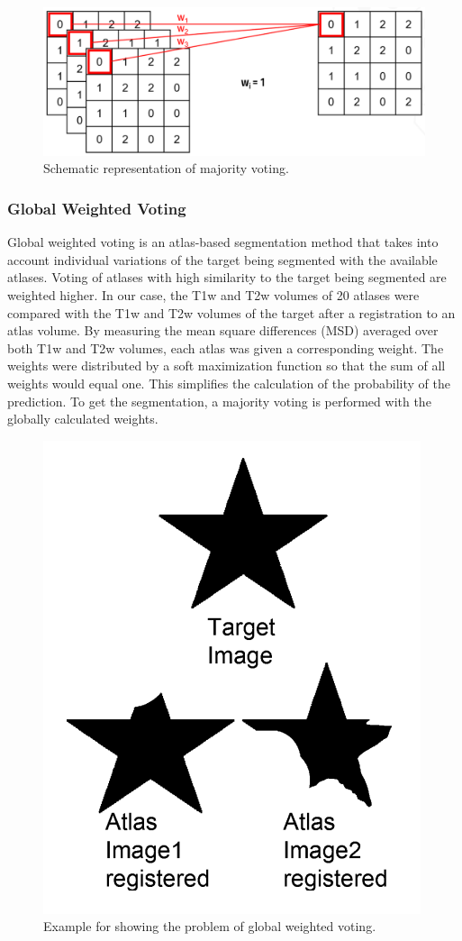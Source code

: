 \begin{figure}[h!]
	\centering
	\includegraphics[width=0.8\linewidth]{img/majorityVoting}
	\caption{Schematic representation of majority voting.}
	\label{fig:majorityVoting}
\end{figure}

\subsubsection*{Global Weighted Voting}
Global weighted voting is an atlas-based segmentation method that takes into account individual variations of the target being segmented with the available atlases. Voting of atlases with high similarity to the target being segmented are weighted higher. In our case, the T1w and T2w volumes of 20 atlases were compared with the T1w and T2w volumes of the target after a registration to an atlas volume. By measuring the mean square differences (MSD) averaged over both T1w and T2w volumes, each atlas was given a corresponding weight.  The weights were distributed by a soft maximization function so that the sum of all weights would equal one. This simplifies the calculation of the probability of the prediction. To get the segmentation, a majority voting is performed with the globally calculated weights.

\begin{figure}[h!]
	\centering
	\includegraphics[width=0.5\linewidth]{img/globalWeightedProblematic}
	\caption{Example for showing the problem of global weighted voting\cite{b2}.}
	\label{fig:globalweightedproblematic}
\end{figure}

